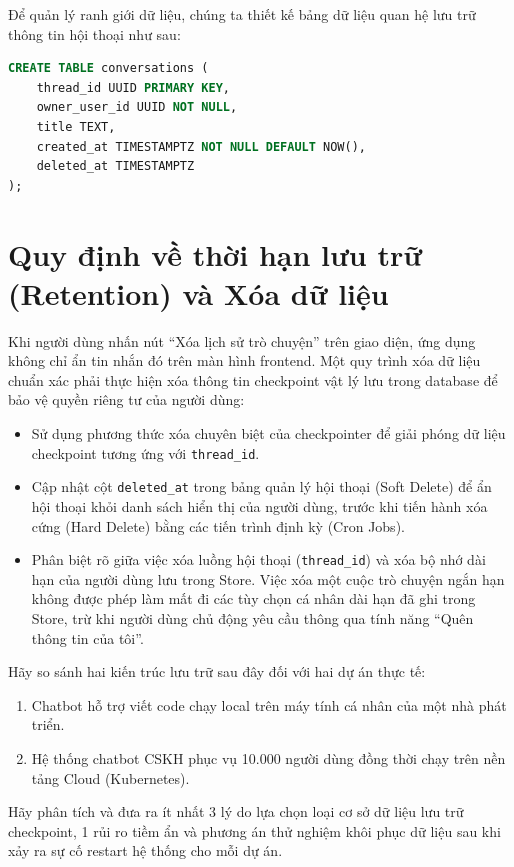 \begin{aiexample}
Để quản lý ranh giới dữ liệu, chúng ta thiết kế bảng dữ liệu quan hệ lưu trữ thông tin hội thoại như sau:
\begin{lstlisting}[language=SQL]
CREATE TABLE conversations (
    thread_id UUID PRIMARY KEY,
    owner_user_id UUID NOT NULL,
    title TEXT,
    created_at TIMESTAMPTZ NOT NULL DEFAULT NOW(),
    deleted_at TIMESTAMPTZ
);
\end{lstlisting}
\end{aiexample}

\section{Quy định về thời hạn lưu trữ (Retention) và Xóa dữ liệu}

Khi người dùng nhấn nút ``Xóa lịch sử trò chuyện'' trên giao diện, ứng dụng không chỉ ẩn tin nhắn đó trên màn hình frontend. Một quy trình xóa dữ liệu chuẩn xác phải thực hiện xóa thông tin checkpoint vật lý lưu trong database để bảo vệ quyền riêng tư của người dùng:

\begin{itemize}
  \item Sử dụng phương thức xóa chuyên biệt của checkpointer để giải phóng dữ liệu checkpoint tương ứng với \texttt{thread\_id}.
  \item Cập nhật cột \texttt{deleted\_at} trong bảng quản lý hội thoại (Soft Delete) để ẩn hội thoại khỏi danh sách hiển thị của người dùng, trước khi tiến hành xóa cứng (Hard Delete) bằng các tiến trình định kỳ (Cron Jobs).
  \item Phân biệt rõ giữa việc xóa luồng hội thoại (\texttt{thread\_id}) và xóa bộ nhớ dài hạn của người dùng lưu trong Store. Việc xóa một cuộc trò chuyện ngắn hạn không được phép làm mất đi các tùy chọn cá nhân dài hạn đã ghi trong Store, trừ khi người dùng chủ động yêu cầu thông qua tính năng ``Quên thông tin của tôi''.
\end{itemize}

\begin{aicheckpoint}
Hãy so sánh hai kiến trúc lưu trữ sau đây đối với hai dự án thực tế:
\begin{enumerate}
  \item Chatbot hỗ trợ viết code chạy local trên máy tính cá nhân của một nhà phát triển.
  \item Hệ thống chatbot CSKH phục vụ 10.000 người dùng đồng thời chạy trên nền tảng Cloud (Kubernetes).
\end{enumerate}
Hãy phân tích và đưa ra ít nhất 3 lý do lựa chọn loại cơ sở dữ liệu lưu trữ checkpoint, 1 rủi ro tiềm ẩn và phương án thử nghiệm khôi phục dữ liệu sau khi xảy ra sự cố restart hệ thống cho mỗi dự án.
\end{aicheckpoint}
